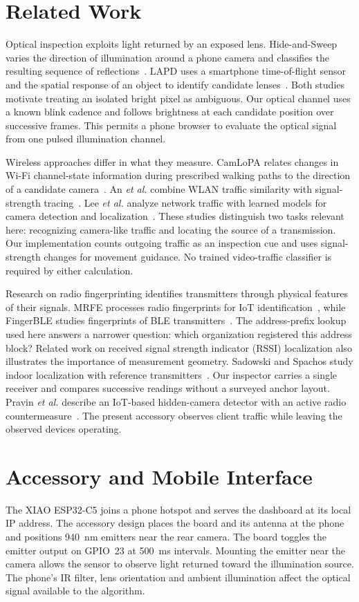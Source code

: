 \documentclass[conference]{IEEEtran}
\begin{document}
\section{Related Work}
Optical inspection exploits light returned by an exposed lens. Hide-and-Sweep varies the direction of illumination around a phone camera and classifies the resulting sequence of reflections~\cite{b1}. LAPD uses a smartphone time-of-flight sensor and the spatial response of an object to identify candidate lenses~\cite{b2}. Both studies motivate treating an isolated bright pixel as ambiguous. Our optical channel uses a known blink cadence and follows brightness at each candidate position over successive frames. This permits a phone browser to evaluate the optical signal from one pulsed illumination channel.

Wireless approaches differ in what they measure. CamLoPA relates changes in Wi-Fi channel-state information during prescribed walking paths to the direction of a candidate camera~\cite{b3}. An \emph{et al.} combine WLAN traffic similarity with signal-strength tracing~\cite{b4,b5}. Lee \emph{et al.} analyze network traffic with learned models for camera detection and localization~\cite{b6}. These studies distinguish two tasks relevant here: recognizing camera-like traffic and locating the source of a transmission. Our implementation counts outgoing traffic as an inspection cue and uses signal-strength changes for movement guidance. No trained video-traffic classifier is required by either calculation.

Research on radio fingerprinting identifies transmitters through physical features of their signals. MRFE processes radio fingerprints for IoT identification~\cite{b7}, while FingerBLE studies fingerprints of BLE transmitters~\cite{b8}. The address-prefix lookup used here answers a narrower question: which organization registered this address block? Related work on received signal strength indicator (RSSI) localization also illustrates the importance of measurement geometry. Sadowski and Spachos study indoor localization with reference transmitters~\cite{b9}. Our inspector carries a single receiver and compares successive readings without a surveyed anchor layout. Pravin \emph{et al.} describe an IoT-based hidden-camera detector with an active radio countermeasure~\cite{b10}. The present accessory observes client traffic while leaving the observed devices operating.

\section{Accessory and Mobile Interface}
The XIAO ESP32-C5 joins a phone hotspot and serves the dashboard at its local IP address. The accessory design places the board and its antenna at the phone and positions 940~nm emitters near the rear camera. The board toggles the emitter output on GPIO~23 at 500~ms intervals. Mounting the emitter near the camera allows the sensor to observe light returned toward the illumination source. The phone's IR filter, lens orientation and ambient illumination affect the optical signal available to the algorithm.
\end{document}
